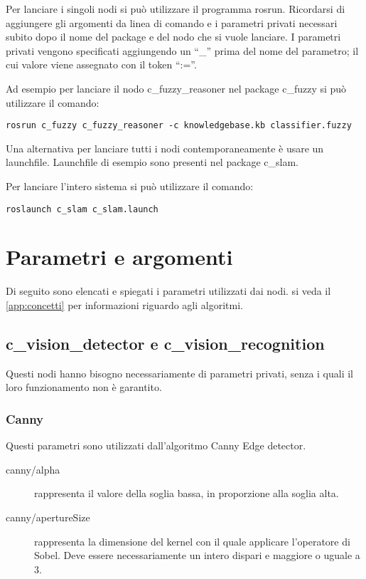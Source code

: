 Per lanciare i singoli nodi si può utilizzare il programma rosrun. Ricordarsi di aggiungere gli argomenti da linea di comando e i parametri privati necessari subito dopo il nome del package e del nodo che si vuole lanciare. 
I parametri privati vengono specificati aggiungendo un ``\_'' prima del nome del parametro; il cui valore viene assegnato con il token ``:=''.

Ad esempio per lanciare il nodo c\_fuzzy\_reasoner nel package c\_fuzzy si può utilizzare il comando:

\begin{verbatim}
rosrun c_fuzzy c_fuzzy_reasoner -c knowledgebase.kb classifier.fuzzy
\end{verbatim}

Una alternativa per lanciare tutti i nodi contemporaneamente è usare un launchfile. Launchfile di esempio sono presenti nel package c\_slam.

Per lanciare l'intero sistema si può utilizzare il comando:

\begin{verbatim}
roslaunch c_slam c_slam.launch
\end{verbatim}


\section{Parametri e argomenti}

Di seguito sono elencati e spiegati i parametri utilizzati dai nodi. si veda il \autoref{app:concetti} per informazioni riguardo agli algoritmi. %

\subsection{c\_vision\_detector e c\_vision\_recognition}

Questi nodi hanno bisogno necessariamente di parametri privati, senza i quali il loro funzionamento non è garantito.

\subsubsection{Canny}

Questi parametri sono utilizzati dall'algoritmo Canny Edge detector.

\begin{description}
 \item [canny/alpha] rappresenta il valore della soglia bassa, in proporzione alla soglia alta.
 \item [canny/apertureSize] rappresenta la dimensione del kernel con il quale applicare l'operatore di Sobel. Deve essere necessariamente un intero dispari e maggiore o uguale a 3. 
\end{description}

